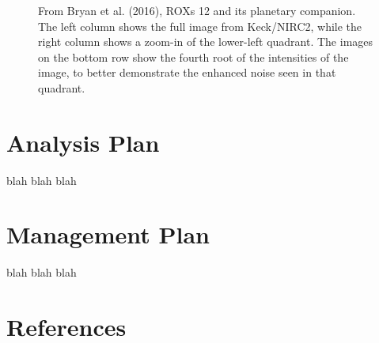 \documentclass[12pt]{article}
\begin{document}
\begin{figure}[H]
\caption{From Bryan et al. (2016), ROXs 12 and its planetary companion. The left column shows the full image from Keck/NIRC2, while the right column shows a zoom-in of the lower-left quadrant. The images on the bottom row show the fourth root of the intensities of the image, to better demonstrate the enhanced noise seen in that quadrant.}
\end{figure}


\newpage
\section*{Analysis Plan}
blah blah blah


\newpage
\section*{Management Plan}
blah blah blah


\newpage
\section*{References}


\end{document}
